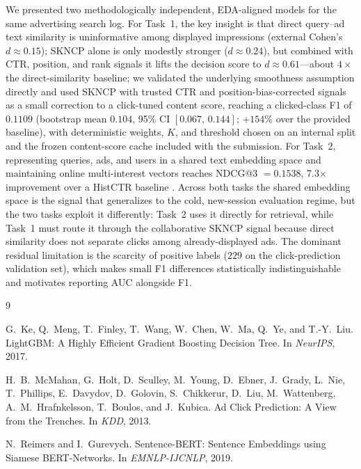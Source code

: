 \documentclass[sigconf, nonacm]{acmart}
\begin{document}
We presented two methodologically independent, EDA-aligned models for the same
advertising search log. For Task~1, the key insight is that direct query--ad
text similarity is uninformative among displayed impressions (external Cohen's
$d\!\approx\!0.15$); SKNCP alone is only modestly stronger ($d\!\approx\!0.24$),
but combined with CTR, position, and rank signals it lifts the decision score to
$d\!\approx\!0.61$---about $4\times$ the direct-similarity baseline; we validated the underlying smoothness assumption
directly and used SKNCP with trusted CTR and position-bias-corrected signals as
a small correction to a click-tuned content score, reaching a clicked-class F1
of $0.1109$ (bootstrap mean $0.104$, 95\% CI $[0.067,\,0.144]$;
$+154\%$ over the provided baseline), with deterministic weights, $K$, and
threshold chosen on an internal split and the frozen content-score cache
included with the submission. For Task~2, representing queries, ads, and users in a shared text
embedding space and maintaining online multi-interest vectors reaches NDCG@3
$=0.1538$, 7.3× improvement over a HistCTR baseline
. Across
both tasks the shared embedding space is the signal that generalizes to the cold,
new-session evaluation regime, but the two tasks exploit it differently: Task~2
uses it directly for retrieval, while Task~1 must route it through the
collaborative SKNCP signal because direct similarity does not separate clicks
among already-displayed ads. The dominant residual limitation is the scarcity of
positive labels ($229$ on the click-prediction validation set), which makes
small F1 differences statistically indistinguishable and motivates reporting AUC
alongside F1.


\begin{thebibliography}{9}

G.~Ke, Q.~Meng, T.~Finley, T.~Wang, W.~Chen, W.~Ma, Q.~Ye, and T.-Y.~Liu.
\newblock LightGBM: A Highly Efficient Gradient Boosting Decision Tree.
\newblock In \textit{NeurIPS}, 2017.

H.~B.~McMahan, G.~Holt, D.~Sculley, M.~Young, D.~Ebner,
J.~Grady, L.~Nie, T.~Phillips, E.~Davydov, D.~Golovin, S.~Chikkerur,
D.~Liu, M.~Wattenberg, A.~M.~Hrafnkelsson, T.~Boulos, and J.~Kubica.
\newblock Ad Click Prediction: A View from the Trenches.
\newblock In \textit{KDD}, 2013.

N.~Reimers and I.~Gurevych.
\newblock Sentence-BERT: Sentence Embeddings using Siamese
BERT-Networks.
\newblock In \textit{EMNLP-IJCNLP}, 2019.

\end{thebibliography}
\end{document}
